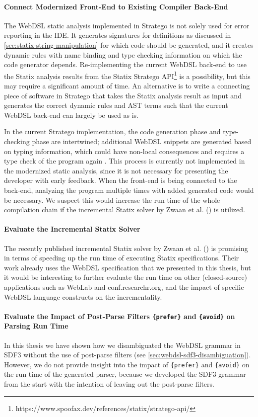     \paragraph{Connect Modernized Front-End to Existing Compiler Back-End} The WebDSL static analysis implemented in Stratego is not solely used for error reporting in the IDE. It generates signatures for definitions as discussed in \cref{sec:statix-string-manipulation} for which code should be generated, and it creates dynamic rules with name binding and type checking information on which the code generator depends. Re-implementing the current WebDSL back-end to use the Statix analysis results from the Statix Stratego API\footnote{https://www.spoofax.dev/references/statix/stratego-api/} is a possibility, but this may require a significant amount of time. An alternative is to write a connecting piece of software in Stratego that takes the Statix analysis result as input and generates the correct dynamic rules and AST terms such that the current WebDSL back-end can largely be used as is.

    In the current Stratego implementation, the code generation phase and type-checking phase are intertwined; additional WebDSL snippets are generated based on typing information, which could have non-local consequences and requires a type check of the program again \autocite{HemelKGV10}. This process is currently not implemented in the modernized static analysis, since it is not necessary for presenting the developer with early feedback. When the front-end is being connected to the back-end, analyzing the program multiple times with added generated code would be necessary. We suspect this would increase the run time of the whole compilation chain if the incremental Statix solver by Zwaan et al. (\citeyear{ZwaanAV22}) is utilized.

    \paragraph{Evaluate the Incremental Statix Solver} The recently published incremental Statix solver by Zwaan et al. (\citeyear{ZwaanAV22}) is promising in terms of speeding up the run time of executing Statix specifications. Their work already uses the WebDSL specification that we presented in this thesis, but it would be interesting to further evaluate the run time on other (closed-source) applications such as WebLab and conf.researchr.org, and the impact of specific WebDSL language constructs on the incrementality.

    \paragraph{Evaluate the Impact of Post-Parse Filters \texttt{\{prefer\}} and \texttt{\{avoid\}} on Parsing Run Time} In this thesis we have shown how we disambiguated the WebDSL grammar in SDF3 without the use of post-parse filters (see \cref{sec:webdsl-sdf3-disambiguation}). However, we do not provide insight into the impact of \texttt{\{prefer\}} and \texttt{\{avoid\}} on the run time of the generated parser, because we developed the SDF3 grammar from the start with the intention of leaving out the post-parse filters.
